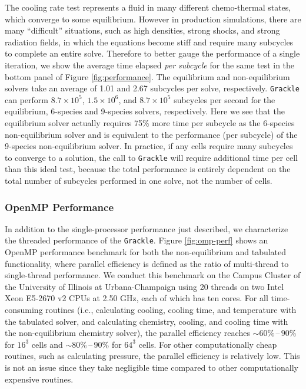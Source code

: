 The cooling rate test represents a fluid in many different
chemo-thermal states, which converge to some equilibrium.  However in
production simulations, there are many ``difficult'' situations, such
as high densities, strong shocks, and strong radiation fields, in
which the equations become stiff and require many subcycles to
complete an entire solve.  Therefore to better gauge the performance
of a single iteration, we show the average time elapsed {\it per
  subcycle} for the same test in the bottom panel of Figure
\ref{fig:performance}.  The equilibrium and non-equilibrium solvers
take an average of 1.01 and 2.67 subcycles per solve, respectively.
\texttt{Grackle} can perform $8.7 \times 10^5$, $1.5 \times 10^6$, and $8.7
\times 10^5$ subcycles per second for the equilibrium, 6-species and
9-species solvers, respectively.  Here we see that the equilibrium
solver actually requires 75\% more time per subcycle as the 6-species
non-equilibrium solver and is equivalent to the performance (per
subcycle) of the 9-species non-equilibrium solver.  In practice, if
any cells require many subcycles to converge to a solution, the call
to \texttt{Grackle} will require additional time per cell than this ideal test,
because the total performance is entirely dependent on the total
number of subcycles performed in one solve, not the number of cells.

\subsubsection{OpenMP Performance}

In addition to the single-processor performance just described, we
characterize the threaded performance of the \texttt{Grackle}.
Figure \ref{fig:omp-perf} shows an OpenMP performance benchmark for both the
non-equilibrium and tabulated functionality, where parallel efficiency is
defined as the ratio of multi-thread to single-thread performance. We
conduct this benchmark on the Campus Cluster of the University of Illinois
at Urbana-Champaign using 20 threads on two Intel Xeon E5-2670 v2 CPUs
at 2.50 GHz, each of which has ten cores. For all time-consuming routines
(i.e., calculating cooling, cooling time, and temperature with the tabulated
solver, and calculating chemistry, cooling, and cooling time with the
non-equilibrium chemistry solver), the parallel efficiency reaches
$\sim 60\%\,\text{--}\,90\%$ for $16^3$ cells and
$\sim 80\%\,\text{--}\,90\%$ for $64^3$ cells. For other computationally cheap
routines, such as calculating pressure, the parallel efficiency is relatively
low. This is not an issue since they take negligible time compared to other
computationally expensive routines.

